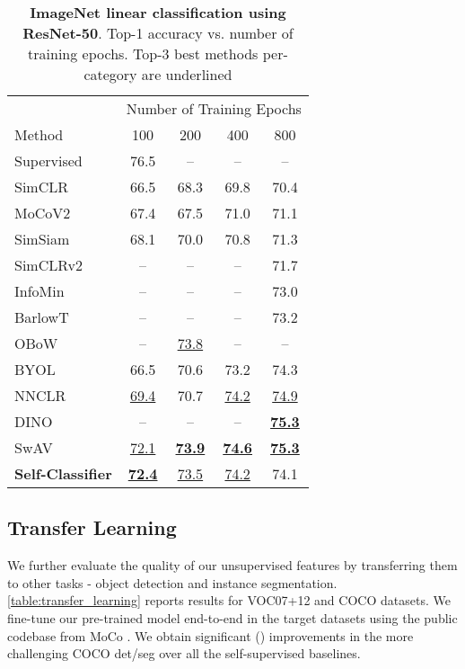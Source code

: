 \documentclass[runningheads]{llncs}
\begin{document}
\begin{table}[bt]
  \centering
  \caption{\textbf{ImageNet linear classification using ResNet-50}. Top-1 accuracy vs. number of training epochs. Top-3 best methods per-category are underlined}
  \label{table:linear_eval_imagenet}
  \setlength\tabcolsep{8pt}
  \begin{tabular}{l|cccc}
    \toprule
     & \multicolumn{4}{c}{Number of Training Epochs} \\
    Method & 100 & 200 & 400 & 800 \\
    \midrule
    Supervised & 76.5 & -- & -- & -- \\
    \midrule
    SimCLR \cite{DBLP:journals/corr/abs-2002-05709} & 66.5 & 68.3 & 69.8 & 70.4 \\
    MoCoV2 \cite{chen2020improved} & 67.4 & 67.5 & 71.0 & 71.1 \\
    SimSiam \cite{chen2021exploring} & 68.1 & 70.0 & 70.8 & 71.3 \\
    SimCLRv2 \cite{chen2020big} & -- & -- & -- & 71.7 \\
    InfoMin \cite{tian2020makes} & -- & -- & -- & 73.0 \\
    BarlowT \cite{DBLP:conf/icml/ZbontarJMLD21} & -- & -- & -- & 73.2 \\
    OBoW \cite{gidaris2021obow} & -- & \underline{73.8} & -- & -- \\
    BYOL \cite{grill2020bootstrap} & 66.5 & 70.6 & 73.2 & 74.3 \\
    NNCLR \cite{Dwibedi_2021_ICCV} & \underline{69.4} & 70.7 & \underline{74.2} & \underline{74.9} \\
    DINO \cite{caron2021emerging} & -- & -- & -- & \underline{\textbf{75.3}} \\
    SwAV \cite{caron2020unsupervised} & \underline{72.1} & \underline{\textbf{73.9}} & \underline{\textbf{74.6}} & \underline{\textbf{75.3}} \\
    \midrule
    \textbf{Self-Classifier}  & \underline{\textbf{72.4}} & \underline{73.5} & \underline{74.2} & 74.1 \\
    \bottomrule
  \end{tabular}
\end{table}

\subsection{Transfer Learning}
We further evaluate the quality of our unsupervised features by transferring them to other tasks - object detection and instance segmentation. \cref{table:transfer_learning} reports results for VOC07+12 \cite{everingham2010pascal} and COCO \cite{lin2014microsoft} datasets. We fine-tune our pre-trained model end-to-end in the target datasets using the public codebase from MoCo \cite{he2020momentum}. We obtain significant () improvements in the more challenging COCO det/seg over all the self-supervised baselines.
\end{document}
